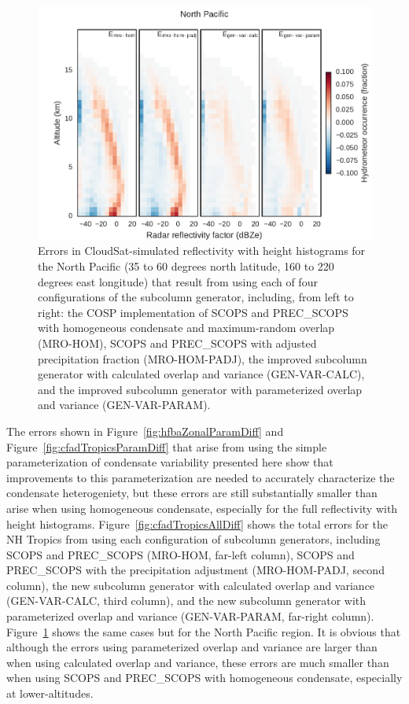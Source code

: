 \begin{figure}[htbp]
\centering
\includegraphics{graphics/subgrid2_cfadDbze94_NorthPacific_all_diff.pdf}
\caption{\label{fig:cfadNPAllDiff}Errors in CloudSat-simulated
reflectivity with height histograms for the North Pacific (35 to 60
degrees north latitude, 160 to 220 degrees east longitude) that result
from using each of four configurations of the subcolumn generator,
including, from left to right: the COSP implementation of SCOPS and
PREC\_SCOPS with homogeneous condensate and maximum-random overlap
(MRO-HOM), SCOPS and PREC\_SCOPS with adjusted precipitation fraction
(MRO-HOM-PADJ), the improved subcolumn generator with calculated overlap
and variance (GEN-VAR-CALC), and the improved subcolumn generator with
parameterized overlap and variance
(GEN-VAR-PARAM).}\label{fig:cfadNPAllDiff}
\end{figure}

The errors shown in Figure~\ref{fig:hfbaZonalParamDiff} and
Figure~\ref{fig:cfadTropicsParamDiff} that arise from using the simple
parameterization of condensate variability presented here show that
improvements to this parameterization are needed to accurately
characterize the condensate heterogeniety, but these errors are still
substantially smaller than arise when using homogeneous condensate,
especially for the full reflectivity with height histograms.
Figure~\ref{fig:cfadTropicsAllDiff} shows the total errors for the NH
Tropics from using each configuration of subcolumn generators, including
SCOPS and PREC\_SCOPS (MRO-HOM, far-left column), SCOPS and PREC\_SCOPS
with the precipitation adjustment (MRO-HOM-PADJ, second column), the new
subcolumn generator with calculated overlap and variance (GEN-VAR-CALC,
third column), and the new subcolumn generator with parameterized
overlap and variance (GEN-VAR-PARAM, far-right column).
Figure~\ref{fig:cfadNPAllDiff} shows the same cases but for the North
Pacific region. It is obvious that although the errors using
parameterized overlap and variance are larger than when using calculated
overlap and variance, these errors are much smaller than when using
SCOPS and PREC\_SCOPS with homogeneous condensate, especially at
lower-altitudes.

